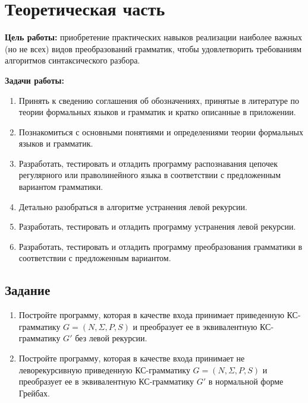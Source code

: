 \chapter{Теоретическая часть}

\textbf{Цель работы:} приобретение практических навыков реализации наиболее важных (но не всех) видов преобразований грамматик, чтобы удовлетворить требованиям алгоритмов синтаксического разбора.

\textbf{Задачи работы:}

\begin{enumerate}
	\item Принять к сведению соглашения об обозначениях, принятые в литературе по теории формальных языков и грамматик и кратко описанные в приложении.	
	\item Познакомиться с основными понятиями и определениями теории формальных языков и грамматик.
	\item Разработать, тестировать и отладить программу распознавания цепочек регулярного или праволинейного языка в соответствии с предложенным вариантом грамматики.
	\item Детально разобраться в алгоритме устранения левой рекурсии.
	\item Разработать, тестировать и отладить программу устранения левой рекурсии.
	\item Разработать, тестировать и отладить программу преобразования грамматики в соответствии с предложенным вариантом.
\end{enumerate}

\section{Задание}

\begin{enumerate}
	\item Постройте программу, которая в качестве входа принимает приведенную КС-грамматику $G = (N, \Sigma, P, S)$ и преобразует ее в эквивалентную КС-грамматику $G'$ без левой рекурсии.
	\item Постройте программу, которая в качестве входа принимает не леворекурсивную приведенную КС-грамматику $G = (N, \Sigma, P, S)$ и преобразует ее в эквивалентную КС-грамматику $G'$ в нормальной форме Грейбах.
\end{enumerate}
   
